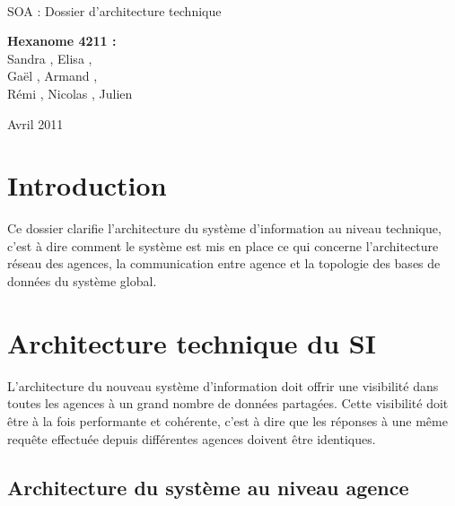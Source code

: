 \documentclass[a4paper]{article}
\begin{document}
\begin{titlepage}
~ 
\vfill
	\begin{center}
		\begin{Huge}
		SOA : Dossier d'architecture technique\\
		\end{Huge} 
\vfill
		\textbf{Hexanome 4211 :} 
		\\Sandra {}, Elisa , 
		\\Gaël , Armand , 
		\\Rémi , Nicolas , Julien \\

\vfill		
		\begin{Large}
		Avril 2011
		\end{Large}
\vfill

	\end{center}
\vfill
\end{titlepage}

\newpage
\tableofcontents
\newpage

\section{Introduction}

Ce dossier clarifie l'architecture du système d'information au niveau technique, c'est à dire comment le système est mis en place ce qui concerne l'architecture réseau des agences, la communication entre agence et la topologie des bases de données du système global. 

\section{Architecture technique du SI}


L'architecture du nouveau système d'information doit offrir une visibilité dans toutes les agences à un grand nombre de données partagées. Cette visibilité doit être à la fois performante et cohérente, c'est à dire que les réponses à une même requête effectuée depuis différentes agences doivent être identiques.

\subsection{Architecture du système au niveau agence}
\end{document}
